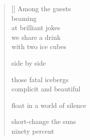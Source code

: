 \documentclass[11pt,a4paper]{article}
\begin{document}
\thispagestyle{empty}


\settowidth{\versewidth}{float in a world of silence}

\bigskip

\begin{verse}[\versewidth]
  Among the guests \\
  beaming\\
  at brilliant jokes\\
  we share a drink\\
  with two ice cubes

  side by side

  those fatal icebergs\\
  complicit and beautiful

  float in a world of silence

  short-change the suns\\
  ninety percent
\end{verse}
\end{document}
